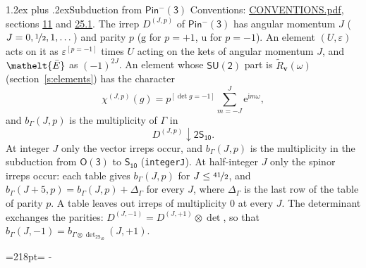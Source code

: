 \documentclass[10pt,a4paper]{article}
\makeatletter
\renewcommand\section{\@startsection{section}{1}{\z@}{-3ex plus -1ex minus -.2ex}%
  {1.2ex plus .2ex}{\normalfont\large\sffamily\bfseries\color{parttitle}}}
\newcommand{\needspace}[1]{\par\penalty-100\begingroup\dimen0=#1\relax\dimen2=\pagegoal
  \advance\dimen2-\pagetotal\ifdim\dimen0>\dimen2\relax\ifdim\dimen2>0pt\vfil\break\fi\fi
  \endgroup}
\numberwithin{equation}{section}
\newcommand{\eltfont}[1]{{\let\sigma\eltsigma\mathelt{#1}}}
\newcommand{\grp}[1]{\mathsf{#1}}
\newcommand{\elt}[1]{\eltfont{#1}}
\newcommand{\ptag}[1]{\mathrm{#1}}
\newcommand{\iverson}[1]{[#1]}
\newcommand{\restr}[2]{#1\!\downarrow#2}
\newcommand{\vv}{\mathbf{v}}
\newcommand{\iunit}{\mathrm{i}}
\newcommand{\expe}{\mathrm{e}}
\newcommand{\irrJp}[2]{D^{(#1,#2)}}
\newcommand{\irrprod}{\otimes}
\newcommand{\barred}[1]{\bar{#1}}
\newcommand{\lift}[1]{\tilde{#1}}
\makeatother
\begin{document}
\section{Subduction from \texorpdfstring{$\grp{Pin^{-}(3)}$}{Pin(3)}}\label{s:subduction_parent}
Conventions: \href{../../CONVENTIONS.pdf}{CONVENTIONS.pdf}, sections \href{../../../rotation/CONVENTIONS.pdf\#conv.11}{11} and \href{../../CONVENTIONS.pdf\#conv.25.1}{25.1}.
\leavevmode\label{n:index.J}\label{n:index.parity}\label{n:irrep.o3}The irrep $\irrJp{J}{p}$ of \href{Pinminus3.pdf}{$\grp{Pin^{-}(3)}$} has angular momentum $J$ ($J = 0, \nicefrac{1}{2}, 1, \dots$) and parity $p$ ($\ptag{g}$ for $p = +1$, $\ptag{u}$ for $p = -1$). An element $(U, \varepsilon)$ acts on it as $\varepsilon^{[p = -1]}$ times $U$ acting on the kets of angular momentum $J$, and $\elt{\barred{E}}$ as $(-1)^{2J}$. \label{n:function.character.parent}\label{n:function.multiplicity}An element whose $\grp{SU(2)}$ part is $\lift{R}_{\vv}(\omega)$ (section~\ref{s:elements}) has the character
\begin{equation}\label{e:chi}\chi^{(J,p)}(g) = p^{\iverson{\det g = -1}}\sum_{m=-J}^{J} \expe^{\iunit m\omega},\end{equation}
and $b_\Gamma(J, p)$ is the multiplicity of $\Gamma$ in
\begin{equation}\label{e:parent}\restr{\irrJp{J}{p}}{\grp{2S_{10}}}.\end{equation}
At integer $J$ only the vector irreps occur, and $b_\Gamma(J, p)$ is the multiplicity in the subduction from $\grp{O(3)}$ to \href{../../../rotation/data/pdf/S10.pdf}{$\grp{S_{10}}$} (\texttt{integerJ}). \label{n:index.increment}At half-integer $J$ only the spinor irreps occur: each table gives $b_\Gamma(J, p)$ for $J \le \nicefrac{41}{2}$, and $b_\Gamma(J + 5, p) = b_\Gamma(J, p) + \Delta_\Gamma$ for every $J$, where $\Delta_\Gamma$ is the last row of the table of parity $p$. A table leaves out irreps of multiplicity 0 at every $J$.
\leavevmode\label{n:operator.determinant.character}The determinant exchanges the parities: $\irrJp{J}{-1} = \irrJp{J}{+1} \irrprod \det$, so that $b_\Gamma(J, -1) = b_{\Gamma \irrprod \det_{\grp{2S_{10}}}}(J, +1)$.
\needspace{218pt}
\end{document}
